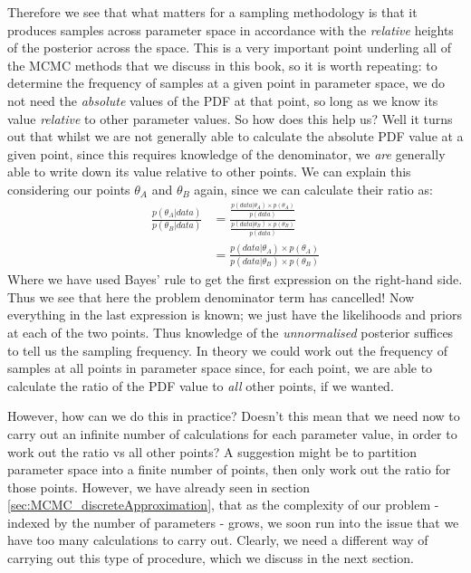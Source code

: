 \documentclass[11pt,fullpage]{book}
\begin{document}
Therefore we see that what matters for a sampling methodology is that it produces samples across parameter space in accordance with the \textit{relative} heights of the posterior across the space. This is a very important point underling all of the MCMC methods that we discuss in this book, so it is worth repeating: to determine the frequency of samples at a given point in parameter space, we do not need the \textit{absolute} values of the PDF at that point, so long as we know its value \textit{relative} to other parameter values. So how does this help us? Well it turns out that whilst we are not generally able to calculate the absolute PDF value at a given point, since this requires knowledge of the denominator, we \textit{are} generally able to write down its value relative to other points. We can explain this considering our points $\theta_A$ and $\theta_B$ again, since we can calculate their ratio as:
%
\begin{equation}
\begin{align}
\frac{p(\theta_A|data)}{p(\theta_B|data)} &= \frac{\frac{p(data|\theta_A)\times p(\theta_A)}{p(data)}}{\frac{p(data|\theta_B)\times p(\theta_B)}{p(data)}}\\
&=\frac{p(data|\theta_A)\times p(\theta_A)}{p(data|\theta_B)\times p(\theta_B)}
\end{align}
\end{equation}
%
Where we have used Bayes' rule to get the first expression on the right-hand side. Thus we see that here the problem denominator term has cancelled! Now everything in the last expression is known; we just have the likelihoods and priors at each of the two points. Thus knowledge of the \textit{unnormalised} posterior suffices to tell us the sampling frequency. In theory we could work out the frequency of samples at all points in parameter space since, for each point, we are able to calculate the ratio of the PDF value to \textit{all} other points, if we wanted.

However, how can we do this in practice? Doesn't this mean that we need now to carry out an infinite number of calculations for each parameter value, in order to work out the ratio vs all other points? A suggestion might be to partition parameter space into a finite number of points, then only work out the ratio for those points. However, we have already seen in section \ref{sec:MCMC_discreteApproximation}, that as the complexity of our problem - indexed by the number of parameters - grows, we soon run into the issue that we have too many calculations to carry out. Clearly, we need a different way of carrying out this type of procedure, which we discuss in the next section.
\end{document}
